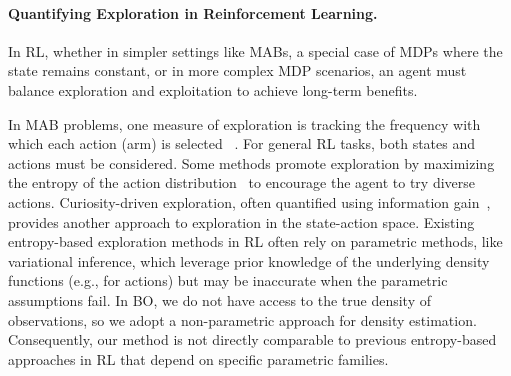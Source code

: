\paragraph{Quantifying Exploration in Reinforcement Learning.}
In \ac{RL}, whether in simpler settings like \acp{MAB}, a special case of \acp{MDP} where the state remains constant, or in more complex \ac{MDP} scenarios, an agent must balance exploration and exploitation to achieve long-term benefits.

In \ac{MAB} problems, one measure of exploration is tracking the frequency with which each action (arm) is selected ~\citep{kuleshov2014algorithms}. For general \ac{RL} tasks, both states and actions must be considered. 
Some methods promote exploration by maximizing the entropy of the action distribution~\citep{williams1991function,ahmed2019understanding} to encourage the agent to try diverse actions. 
Curiosity-driven exploration, often quantified using information gain~\citep{sun2011planning,houthooft2016vime}, provides another approach to exploration in the state-action space. 
Existing entropy-based exploration methods in \ac{RL} often rely on parametric methods, like variational inference, which leverage prior knowledge of the underlying density functions (e.g., for actions) but may be inaccurate when the parametric assumptions fail. In \ac{BO}, we do not have access to the true density of observations, so we adopt a non-parametric approach for density estimation. Consequently, our method is not directly comparable to previous entropy-based approaches in \ac{RL} that depend on specific parametric families.